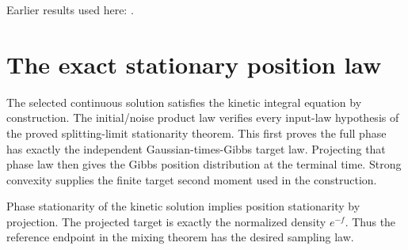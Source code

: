 \documentclass[11pt,a4paper]{article}
\begin{document}
Earlier results used here: \cite[Section~3.8.17]{LangevinLean2026ULASC}.

\section{\texorpdfstring{The exact stationary position law}{The exact stationary position law}}


The selected continuous solution satisfies the kinetic integral equation by construction. The initial/\allowbreak{}noise product law verifies every input-law hypothesis of the proved splitting-limit stationarity theorem. This first proves the full phase has exactly the independent Gaussian-times-Gibbs target law. Projecting that phase law then gives the Gibbs position distribution at the terminal time. Strong convexity supplies the finite target second moment used in the construction.



Phase stationarity of the kinetic solution implies position stationarity by projection. The projected target is exactly the normalized density \(e^{-f}\). Thus the reference endpoint in the mixing theorem has the desired sampling law.
\end{document}
